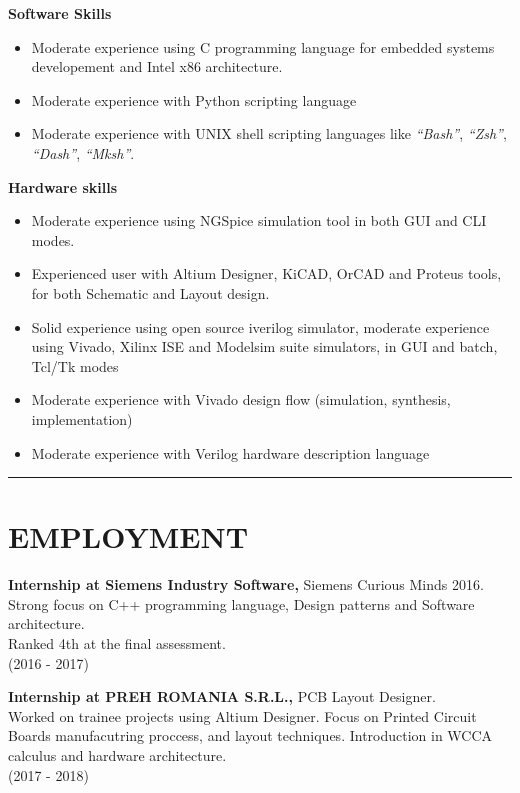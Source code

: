 \documentclass{resume}
\begin{document}
\begin{resume}
   {\bf Software Skills}   
        \begin{itemize}
        \item[] Moderate experience using C programming language for embedded systems developement and
        Intel x86 architecture.
        \item[] Moderate experience with Python scripting language
        \item[] Moderate experience with UNIX shell scripting languages like 
        {\it ``Bash''}, {\it ``Zsh''}, {\it ``Dash''}, {\it ``Mksh''}.
        \end{itemize}

   {\bf Hardware skills}   
        \begin{itemize}
        \item[] Moderate experience using NGSpice simulation tool in both GUI and CLI modes.
        \item[] Experienced user with Altium Designer, KiCAD, OrCAD and Proteus tools,
        for both Schematic and Layout design.
        \item[] Solid experience using open source iverilog simulator, moderate experience using Vivado,
        Xilinx ISE and Modelsim suite simulators, in GUI and batch, Tcl/Tk modes
        \item[] Moderate experience with Vivado design flow (simulation, synthesis, implementation)
        \item[] Moderate experience with Verilog hardware description language
        \end{itemize}

\noindent\rule{\textwidth}{0.4pt}
\section{EMPLOYMENT} 
\vspace{0.1in} 
    {\bf Internship at Siemens Industry Software,} Siemens Curious Minds 2016.\\
    Strong focus on C++ programming language, Design patterns and Software architecture.\\
    Ranked 4th at the final assessment.\\
    (2016 - 2017) 
 
    {\bf Internship at PREH ROMANIA S.R.L.,} PCB Layout Designer.\\
    Worked on trainee projects using Altium Designer. 
    Focus on Printed Circuit Boards manufacutring proccess, and layout techniques.
    Introduction in WCCA calculus and hardware architecture.\\
    (2017 - 2018)


\end{resume}
\end{document}
